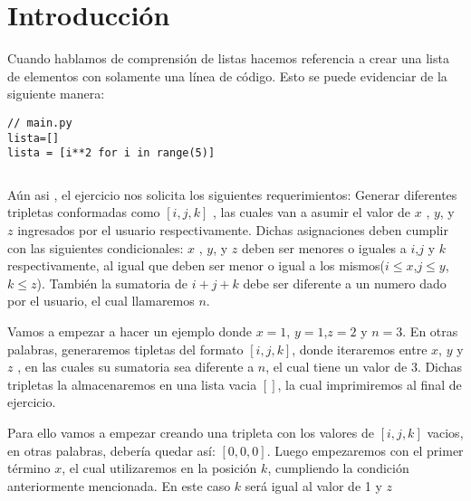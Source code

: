 \documentclass{jornada} %
\author[1*]{Pedro Felipe Gómez Bonilla} %
\affil[1]{Campuslands}
\begin{document}
\pretext %


\section{Introducción}

Cuando hablamos de comprensión de listas hacemos referencia a crear una lista de elementos con solamente una línea de código. Esto se puede evidenciar de la siguiente manera:
\begin{lstlisting}
// main.py
lista=[]
lista = [i**2 for i in range(5)]
\end{lstlisting}
\begin{subequations}

\end{subequations}

Aún asi , el ejercicio nos solicita los siguientes requerimientos: Generar diferentes tripletas conformadas como \([i,j,k]\) , las cuales van a asumir el valor de \(x\) , \(y\), y \(z\) ingresados por el usuario respectivamente. Dichas asignaciones deben cumplir con las siguientes condicionales: \(x\) , \(y\), y \(z\) deben ser menores o iguales a \(i\),\(j\) y \(k\) respectivamente, al igual que deben ser menor o igual a los mismos(\(i\leq x\),\(j\leq y\),\(k\leq z\)). También la sumatoria de \(i+j+k\) debe ser diferente a un numero dado por el usuario, el cual llamaremos \(n\).

Vamos a empezar a hacer un ejemplo donde \(x=1\), \(y=1\),\(z=2\) y \(n=3\). En otras palabras, generaremos tipletas del formato \([i,j,k]\), donde iteraremos entre \(x\), \(y\) y \(z\) , en las cuales su sumatoria sea diferente a \(n\), el cual tiene un valor de \(3\). Dichas tripletas la almacenaremos en una lista vacia \([ ]\), la cual imprimiremos al final de ejercicio.

Para ello vamos a empezar creando una tripleta con los valores de \([i,j,k]\) vacios, en otras palabras, debería quedar así: \([0,0,0]\). Luego empezaremos con el primer término \(x\), el cual utilizaremos en la posición \(k\), cumpliendo la condición anteriormente mencionada. En este caso \(k\) será igual al valor de 1 y \(z\)
\end{document}
